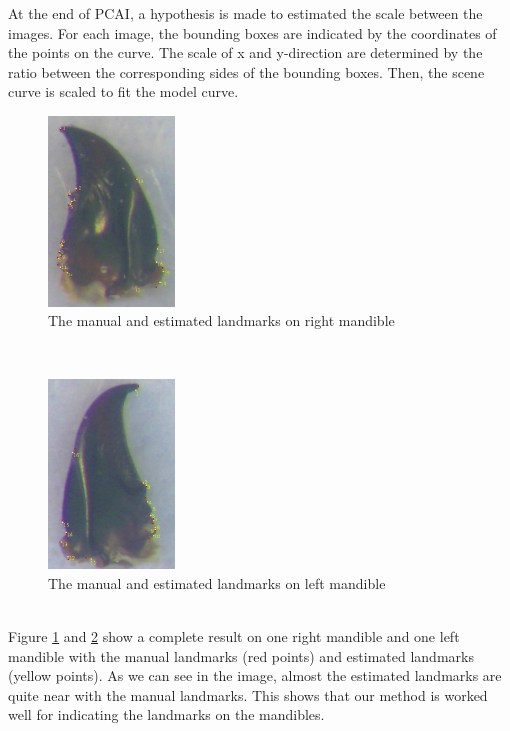 \documentclass[twoside,twocolumn,10pt]{article}
\begin{document}
At the end of PCAI, a hypothesis is made to estimated the scale between the images. For each image, the bounding boxes are indicated by the coordinates of the points on the curve. The scale of x and y-direction are determined by the ratio between the corresponding sides of the bounding boxes. Then, the scene curve is scaled to fit the model curve. 
\begin{figure}[h]
\centering
\includegraphics[width=0.3\textwidth]{./images/md_rs}
\caption{The manual and estimated landmarks on right mandible}
\label{figresult}
\end{figure}~\\
\begin{figure}[h]
\centering
\includegraphics[width=0.3\textwidth]{./images/mg_rs}
\caption{The manual and estimated landmarks on left mandible}
\label{figresult2}
\end{figure}~\\
Figure \ref{figresult} and \ref{figresult2} show a complete result on one right mandible and one left mandible with the manual landmarks (red points) and estimated landmarks (yellow points). As we can see in the image, almost the estimated landmarks are quite near with the manual landmarks. This shows that our method is worked well for indicating the landmarks on the mandibles.\\
\end{document}
